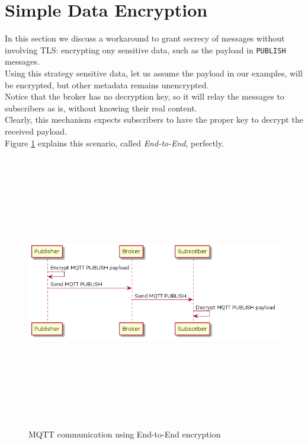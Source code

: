 \documentclass[12pt]{report}
\begin{document}
{%


\section{Simple Data Encryption}
\bigskip

In this section we discuss a workaround to grant secrecy of messages without involving TLS: encrypting ony sensitive data, such as the payload in \texttt{PUBLISH} messages.\\

Using this strategy sensitive data, let us assume the payload in our examples, will be encrypted, but other metadata remains unencrypted.\\
Notice that the broker has no decryption key, so it will relay the messages to subscribers as is, without knowing their real content.\\
Clearly, this mechanism expects subscribers to have the proper key to decrypt the received payload.\\

Figure \ref{fig:endtoend} explains this scenario, called \emph{End-to-End}, perfectly.

\begin{figure}[H]
\includegraphics[width=12.5cm,height=12cm,keepaspectratio]{end_to_end}
\centering
\caption{MQTT communication using End-to-End encryption}
\label{fig:endtoend}
\end{figure}

}
\end{document}
